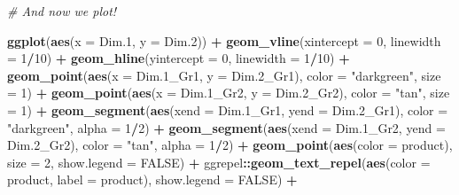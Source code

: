 \documentclass[
]{book}
\newenvironment{Shaded}{\begin{snugshade}}{\end{snugshade}}
\newcommand{\AttributeTok}[1]{\textcolor[rgb]{0.13,0.29,0.53}{#1}}
\newcommand{\CommentTok}[1]{\textcolor[rgb]{0.56,0.35,0.01}{\textit{#1}}}
\newcommand{\ConstantTok}[1]{\textcolor[rgb]{0.56,0.35,0.01}{#1}}
\newcommand{\DecValTok}[1]{\textcolor[rgb]{0.00,0.00,0.81}{#1}}
\newcommand{\FloatTok}[1]{\textcolor[rgb]{0.00,0.00,0.81}{#1}}
\newcommand{\FunctionTok}[1]{\textcolor[rgb]{0.13,0.29,0.53}{\textbf{#1}}}
\newcommand{\NormalTok}[1]{#1}
\newcommand{\SpecialCharTok}[1]{\textcolor[rgb]{0.81,0.36,0.00}{\textbf{#1}}}
\newcommand{\StringTok}[1]{\textcolor[rgb]{0.31,0.60,0.02}{#1}}
\begin{document}
\begin{Shaded}
\begin{Highlighting}[]
  \CommentTok{\# And now we plot!}
  
  \FunctionTok{ggplot}\NormalTok{(}\FunctionTok{aes}\NormalTok{(}\AttributeTok{x =}\NormalTok{ Dim}\FloatTok{.1}\NormalTok{, }\AttributeTok{y =}\NormalTok{ Dim}\FloatTok{.2}\NormalTok{)) }\SpecialCharTok{+}
  \FunctionTok{geom\_vline}\NormalTok{(}\AttributeTok{xintercept =} \DecValTok{0}\NormalTok{, }\AttributeTok{linewidth =} \DecValTok{1}\SpecialCharTok{/}\DecValTok{10}\NormalTok{) }\SpecialCharTok{+} 
  \FunctionTok{geom\_hline}\NormalTok{(}\AttributeTok{yintercept =} \DecValTok{0}\NormalTok{, }\AttributeTok{linewidth =} \DecValTok{1}\SpecialCharTok{/}\DecValTok{10}\NormalTok{) }\SpecialCharTok{+} 
  \FunctionTok{geom\_point}\NormalTok{(}\FunctionTok{aes}\NormalTok{(}\AttributeTok{x =}\NormalTok{ Dim}\FloatTok{.1}\NormalTok{\_Gr1, }\AttributeTok{y =}\NormalTok{ Dim}\FloatTok{.2}\NormalTok{\_Gr1), }
             \AttributeTok{color =} \StringTok{"darkgreen"}\NormalTok{, }\AttributeTok{size =} \DecValTok{1}\NormalTok{) }\SpecialCharTok{+} 
  \FunctionTok{geom\_point}\NormalTok{(}\FunctionTok{aes}\NormalTok{(}\AttributeTok{x =}\NormalTok{ Dim}\FloatTok{.1}\NormalTok{\_Gr2, }\AttributeTok{y =}\NormalTok{ Dim}\FloatTok{.2}\NormalTok{\_Gr2), }
             \AttributeTok{color =} \StringTok{"tan"}\NormalTok{, }\AttributeTok{size =} \DecValTok{1}\NormalTok{) }\SpecialCharTok{+} 
  \FunctionTok{geom\_segment}\NormalTok{(}\FunctionTok{aes}\NormalTok{(}\AttributeTok{xend =}\NormalTok{ Dim}\FloatTok{.1}\NormalTok{\_Gr1, }\AttributeTok{yend =}\NormalTok{ Dim}\FloatTok{.2}\NormalTok{\_Gr1), }
               \AttributeTok{color =} \StringTok{"darkgreen"}\NormalTok{, }\AttributeTok{alpha =} \DecValTok{1}\SpecialCharTok{/}\DecValTok{2}\NormalTok{) }\SpecialCharTok{+} 
  \FunctionTok{geom\_segment}\NormalTok{(}\FunctionTok{aes}\NormalTok{(}\AttributeTok{xend =}\NormalTok{ Dim}\FloatTok{.1}\NormalTok{\_Gr2, }\AttributeTok{yend =}\NormalTok{ Dim}\FloatTok{.2}\NormalTok{\_Gr2),}
               \AttributeTok{color =} \StringTok{"tan"}\NormalTok{, }\AttributeTok{alpha =} \DecValTok{1}\SpecialCharTok{/}\DecValTok{2}\NormalTok{) }\SpecialCharTok{+} 
  \FunctionTok{geom\_point}\NormalTok{(}\FunctionTok{aes}\NormalTok{(}\AttributeTok{color =}\NormalTok{ product), }
             \AttributeTok{size =} \DecValTok{2}\NormalTok{, }\AttributeTok{show.legend =} \ConstantTok{FALSE}\NormalTok{) }\SpecialCharTok{+} 
\NormalTok{  ggrepel}\SpecialCharTok{::}\FunctionTok{geom\_text\_repel}\NormalTok{(}\FunctionTok{aes}\NormalTok{(}\AttributeTok{color =}\NormalTok{ product, }\AttributeTok{label =}\NormalTok{ product), }\AttributeTok{show.legend =} \ConstantTok{FALSE}\NormalTok{) }\SpecialCharTok{+} 

\end{Highlighting}
\end{Shaded}
\end{document}
